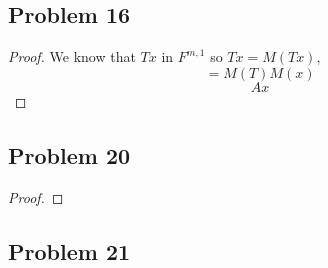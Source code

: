\documentclass[a4paper]{report}
\begin{document}
\subsection*{Problem 16}
\begin{proof}
    
    We know that $Tx$ in $F^{m,1}$ so $Tx = M(Tx)$,  
    $$ = M(T)M(x) $$ 
    $$ Ax $$ 
\end{proof}
\subsection*{Problem 20}
\begin{proof}
    
\end{proof}
\subsection*{Problem 21}
\end{document}
